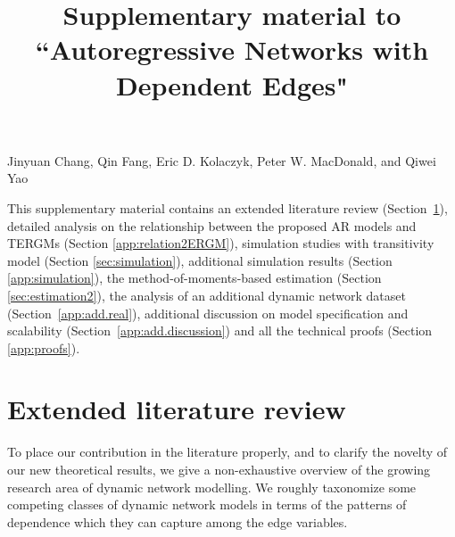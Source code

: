 \documentclass[12pt]{article}
\newcommand{\0}{{\bf 0}}
\begin{document}

\newpage
\linespread{1.4}\selectfont
	\begin{center}
		\title{\large \bf Supplementary material to ``Autoregressive Networks with Dependent Edges"}	
\end{center}
\begin{center}
	{\noindent Jinyuan Chang, Qin Fang, Eric D. Kolaczyk, Peter W. MacDonald, and Qiwei Yao}
\end{center}
\bigskip
	
	\renewcommand{\theequation}{\thesection.\arabic{equation}}

 \renewcommand{\thepage}{S\arabic{page}}


\setcounter{page}{1}
\setcounter{equation}{0}
\setcounter{section}{0}
\setcounter{table}{0}
\renewcommand{\thesection}{\Alph{section}}	
\renewcommand{\thefigure}{S\arabic{figure}}
\renewcommand{\thetable}{S\arabic{table}}
\setcounter{figure}{0}

This supplementary material contains an extended literature review (Section~\ref{app:extendedlit}), detailed analysis on the relationship
between the proposed AR models and TERGMs (Section \ref{app:relation2ERGM}), simulation studies with transitivity model (Section \ref{sec:simulation}), additional simulation results (Section \ref{app:simulation}), the method-of-moments-based estimation (Section \ref{sec:estimation2}), the analysis of an additional dynamic network dataset (Section~\ref{app:add.real}), additional discussion on  model specification and scalability (Section~\ref{app:add.discussion})
and all the technical proofs (Section \ref{app:proofs}).

\section{Extended literature review}
\label{app:extendedlit}

To place our contribution in the literature properly, and to clarify the novelty of our new theoretical results, we give a non-exhaustive overview of the growing research area of dynamic network modelling. We roughly taxonomize some competing classes of dynamic network models in terms of the patterns of dependence which they can capture among the edge variables.
\end{document}
